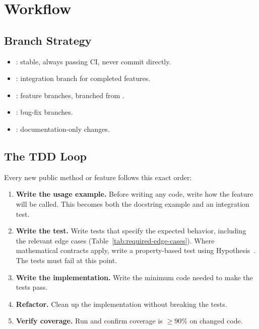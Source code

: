 \section{Workflow}

\subsection{Branch Strategy}

\begin{itemize}[noitemsep,topsep=2pt]
  \item {}: stable, always passing CI, never commit directly.
  \item {}: integration branch for completed features.
  \item {}: feature branches, branched from .
  \item {}: bug-fix branches.
  \item {}: documentation-only changes.
\end{itemize}

\subsection{The TDD Loop}

Every new public method or feature follows this exact order:

\begin{enumerate}
  \item \textbf{Write the usage example.} Before writing any code, write
    how the feature will be called. This becomes both the docstring
    example and an integration test.
  \item \textbf{Write the test.} Write  tests that specify
    the expected behavior, including the relevant edge cases
    (Table~\ref{tab:required-edge-cases}). Where mathematical contracts
    apply, write a property-based test using
    Hypothesis~\citep{hypothesis}. The tests must fail at this point.
  \item \textbf{Write the implementation.} Write the minimum code needed
    to make the tests pass.
  \item \textbf{Refactor.} Clean up the implementation without breaking
    the tests.
  \item \textbf{Verify coverage.} Run  and
    confirm coverage is $\ge 90\%$ on changed code.
\end{enumerate}

